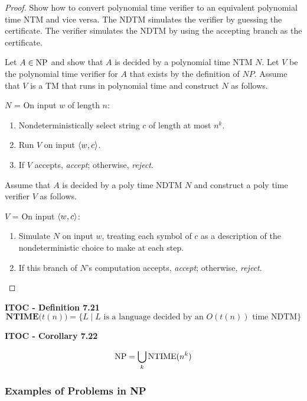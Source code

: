 \begin{mdframed}
\begin{proof}
Show how to convert polynomial time verifier to an equivalent polynomial time NTM and vice versa. The NDTM simulates the verifier by guessing the certificate. The verifier simulates the NDTM by using the accepting branch as the certificate.

\medskip
Let $A \in \text{NP}$ and show that $A$ is decided by a polynomial time NTM $N$. Let $V$ be the polynomial time verifier for $A$ that exists by the definition of $NP$. Assume that $V$ is a TM that runs in polynomial time and construct $N$ as follows.

\medskip
$N$ = On input $w$ of length $n$:
\begin{enumerate}
\item Nondeterministically select string $c$ of length at most $n^k$.
\item Run $V$ on input $\langle{w, c}\rangle$.
\item If $V$ accepts, \textit{accept}; otherwise, \textit{reject}.
\end{enumerate}

\medskip
Assume that $A$ is decided by a poly time NDTM $N$ and construct a poly time verifier $V$ as follows.

\medskip
$V$ = On input $\langle{w, c}\rangle$:
\begin{enumerate}
\item Simulate $N$ on input $w$, treating each symbol of $c$ as a description of the nondeterministic choice to make at each step.
\item If this branch of $N$'s computation accepts, \textit{accept}; otherwise, \textit{reject}.
\end{enumerate}

\end{proof}
\end{mdframed}

\begin{shaded}
\textbf{ITOC - Definition 7.21}
\[
\textbf{NTIME($t(n)$)} = \{ L \mid \text{$L$ is a language decided by an $O(t(n))$ time NDTM}\}
\]
\end{shaded}

\begin{shaded}
\textbf{ITOC - Corollary 7.22}

\medskip
\[
\text{NP} = \bigcup_k \text{NTIME}(n^k)
\]
\end{shaded}

\subsubsection{Examples of Problems in NP}

